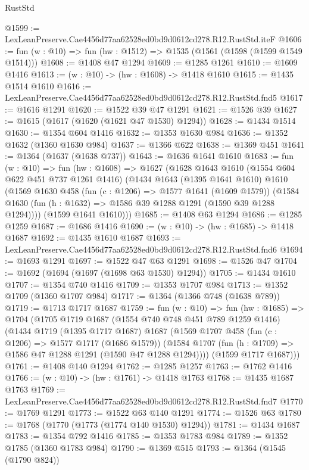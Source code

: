 \begin{lexlean}{RustStd}
\begin{coremodule}
@1599 := LexLeanPreserve.Cae4456d77aa62528ed0bd9d0612cd278.R12.RustStd.iteF
@1606 := fun (w : @10) => fun (hw : @1512) => @1535 (@1561 (@1598 (@1599 @1549 @1514)))
@1608 := @1408 @47 @1294
@1609 := @1285 @1261
@1610 := @1609 @1416
@1613 := (w : @10) -> (hw : @1608) -> @1418 @1610
@1615 := @1435 @1514 @1610
@1616 := LexLeanPreserve.Cae4456d77aa62528ed0bd9d0612cd278.R12.RustStd.fnd5
@1617 := @1616 @1291
@1620 := @1522 @39 @47 @1291
@1621 := @1526 @39
@1627 := @1615 (@1617 (@1620 (@1621 @47 @1530) @1294))
@1628 := @1434 @1514
@1630 := @1354 @604 @1416
@1632 := @1353 @1630 @984
@1636 := @1352 @1632 (@1360 @1630 @984)
@1637 := @1366 @622
@1638 := @1369 @451
@1641 := @1364 (@1637 (@1638 @737))
@1643 := @1636 @1641 @1610
@1683 := fun (w : @10) =>
  fun (hw : @1608) =>
  @1627
    (@1628
      @1643
      @1610
      (@1554 @604 @622 @451 @737 @1261 @1416)
      (@1434
        @1643
        (@1395 @1641 @1610)
        @1610
        (@1569
          @1630
          @458
          (fun (c : @1206) => @1577 @1641 (@1609 @1579))
          (@1584 @1630 (fun (h : @1632) => @1586 @39 @1288 @1291 (@1590 @39 @1288 @1294))))
        (@1599 @1641 @1610)))
@1685 := @1408 @63 @1294
@1686 := @1285 @1259
@1687 := @1686 @1416
@1690 := (w : @10) -> (hw : @1685) -> @1418 @1687
@1692 := @1435 @1610 @1687
@1693 := LexLeanPreserve.Cae4456d77aa62528ed0bd9d0612cd278.R12.RustStd.fnd6
@1694 := @1693 @1291
@1697 := @1522 @47 @63 @1291
@1698 := @1526 @47
@1704 := @1692 (@1694 (@1697 (@1698 @63 @1530) @1294))
@1705 := @1434 @1610
@1707 := @1354 @740 @1416
@1709 := @1353 @1707 @984
@1713 := @1352 @1709 (@1360 @1707 @984)
@1717 := @1364 (@1366 @748 (@1638 @789))
@1719 := @1713 @1717 @1687
@1759 := fun (w : @10) =>
  fun (hw : @1685) =>
  @1704
    (@1705
      @1719
      @1687
      (@1554 @740 @748 @451 @789 @1259 @1416)
      (@1434
        @1719
        (@1395 @1717 @1687)
        @1687
        (@1569
          @1707
          @458
          (fun (c : @1206) => @1577 @1717 (@1686 @1579))
          (@1584 @1707 (fun (h : @1709) => @1586 @47 @1288 @1291 (@1590 @47 @1288 @1294))))
        (@1599 @1717 @1687)))
@1761 := @1408 @140 @1294
@1762 := @1285 @1257
@1763 := @1762 @1416
@1766 := (w : @10) -> (hw : @1761) -> @1418 @1763
@1768 := @1435 @1687 @1763
@1769 := LexLeanPreserve.Cae4456d77aa62528ed0bd9d0612cd278.R12.RustStd.fnd7
@1770 := @1769 @1291
@1773 := @1522 @63 @140 @1291
@1774 := @1526 @63
@1780 := @1768 (@1770 (@1773 (@1774 @140 @1530) @1294))
@1781 := @1434 @1687
@1783 := @1354 @792 @1416
@1785 := @1353 @1783 @984
@1789 := @1352 @1785 (@1360 @1783 @984)
@1790 := @1369 @515
@1793 := @1364 (@1545 (@1790 @824))

\end{coremodule}
\end{lexlean}

